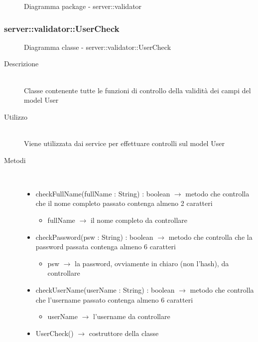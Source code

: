 \begin{center}
\begin{figure}[H]
		\caption{Diagramma package - server::validator}
	\end{figure}
\end{center}\hypertarget{server::validator::UserCheck}{}
\subsubsection[UserCheck]{server::validator::UserCheck}
\begin{figure}[H]
	\centering
	\caption{Diagramma classe - server::validator::UserCheck}
\end{figure}\begin{description}
\item[Descrizione] \hfill \\
Classe contenente tutte le funzioni di controllo della validità dei campi del model User
\item[Utilizzo] \hfill \\
Viene utilizzata dai service per effettuare controlli sul model User
\item[Metodi] \hfill \\
\vspace{-7mm}
\begin{itemize}
	\item checkFullName(fullName : String) : boolean $\rightarrow$ metodo che controlla che il nome completo passato contenga almeno 2 caratteri\begin{itemize}
		\item fullName $\rightarrow$ il nome completo da controllare
	\end{itemize}
	
	\item checkPassword(psw : String) : boolean $\rightarrow$ metodo che controlla che la password passata contenga almeno 6 caratteri\begin{itemize}
		\item psw $\rightarrow$ la password, ovviamente in chiaro (non l'hash), da controllare
	\end{itemize}
	
	\item checkUserName(userName : String) : boolean $\rightarrow$ metodo che controlla che l'username passato contenga almeno 6 caratteri\begin{itemize}
		\item userName $\rightarrow$ l'username da controllare
	\end{itemize}
	
	\item UserCheck() $\rightarrow$ costruttore della classe
\end{itemize}

\end{description}

